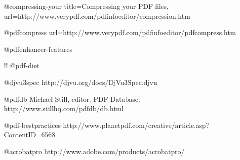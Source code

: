 \documentclass{ltugproc}
\begin{document}
@compressing-your{
  title={Compressing your PDF files},
  url={http://www.verypdf.com/pdfinfoeditor/compression.htm}
}

@pdfcompress{
  url={http://www.verypdf.com/pdfinfoeditor/pdfcompress.htm}
}

@pdfenhancer-features{
}

!!
@pdf-diet{
}

@djvu3spec{
http://djvu.org/docs/DjVu3Spec.djvu
}

@pdfdb{
Michael Still, editor. PDF Database.
http://www.stillhq.com/pdfdb/db.html
}

@pdf-bestpractices{
http://www.planetpdf.com/creative/article.asp?ContentID=6568
}

@acrobatpro{
http://www.adobe.com/products/acrobatpro/
}
\end{document}
